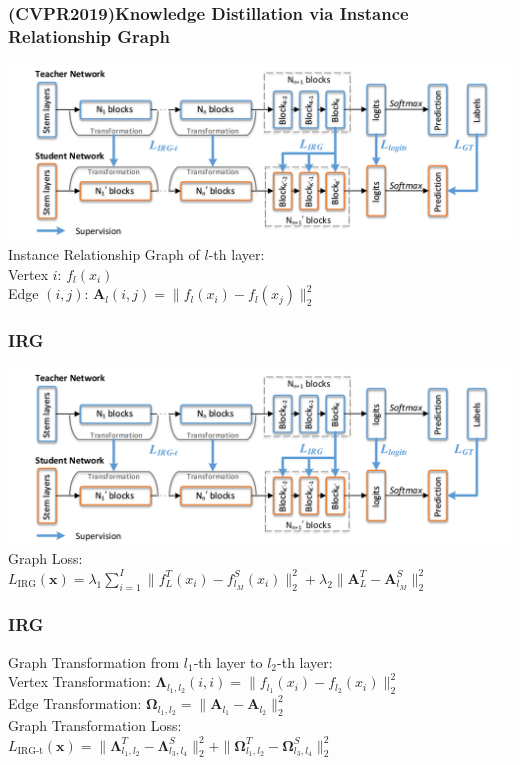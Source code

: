\documentclass{beamer}
\begin{document}
\begin{frame}
\frametitle{(CVPR2019)Knowledge Distillation via Instance Relationship Graph}
\includegraphics[width=1.0\textwidth]{irg.png}
Instance Relationship Graph of $l$-th layer:\\
Vertex $i$: $f_l(x_i)$ \\
Edge $(i,j)$: $\bm A_{l}(i, j)=\|f_l(x_i)-f_l(x_j)\|_2^2$ \\
\end{frame}

\begin{frame}
\frametitle{IRG}
\includegraphics[width=1.0\textwidth]{irg.png}
Graph Loss:\\
$L_{\textrm{IRG}}(\bm x)=\lambda_1\sum\limits_{i=1}^I\|f^T_L(x_i)-f^S_{l_M}(x_i)\|_2^2+\lambda_2\|\bm A^T_L-\bm A^S_{l_M}\|_2^2$ \\
\end{frame}

\begin{frame}
\frametitle{IRG}
Graph Transformation from $l_1$-th layer to $l_2$-th layer:\\
Vertex Transformation: $\bm \Lambda_{l_1,l_2}(i, i)=\|f_{l_1}(x_i)-f_{l_2}(x_i)\|_2^2$\\
Edge Transformation: $\bm \Omega_{l_1,l_2}=\|\bm A_{l_1}-\bm A_{l_2}\|_2^2$ \\
\vspace{5mm}
Graph Transformation Loss:\\
$L_{\textrm{IRG-t}}(\bm x)=\|\bm \Lambda^T_{l_1,l_2}-\bm \Lambda^S_{l_3,l_4}\|_2^2+\|\bm \Omega^T_{l_1,l_2}-\bm \Omega^S_{l_3,l_4}\|_2^2$ \\


\end{frame}
\end{document}
